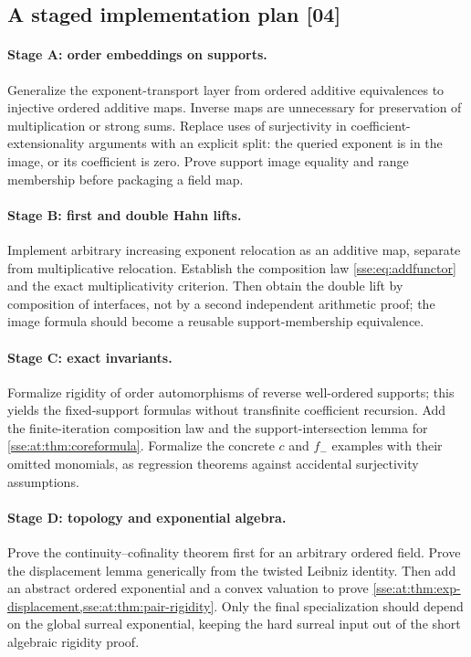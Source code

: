 \documentclass[11pt,a4paper]{article}
\numberwithin{equation}{section}
\theoremstyle{plain}
\theoremstyle{definition}
\theoremstyle{remark}
\newcommand{\src}[1]{\textup{\textsf{\small[#1]}}}%
\begin{document}
\subsection{A staged implementation plan \src{04}}
\paragraph{Stage A: order embeddings on supports.} Generalize the
exponent-transport layer from ordered additive equivalences to injective
ordered additive maps. Inverse maps are unnecessary for preservation of
multiplication or strong sums. Replace uses of surjectivity in
coefficient-extensionality arguments with an explicit split: the queried
exponent is in the image, or its coefficient is zero. Prove support image
equality and range membership before packaging a field map.

\paragraph{Stage B: first and double Hahn lifts.} Implement arbitrary
increasing exponent relocation as an additive map, separate from
multiplicative relocation. Establish the composition law
\eqref{sse:eq:addfunctor} and the exact multiplicativity criterion. Then obtain
the double lift by composition of interfaces, not by a second independent
arithmetic proof; the image formula should become a reusable
support-membership equivalence.

\paragraph{Stage C: exact invariants.} Formalize rigidity of order
automorphisms of reverse well-ordered supports; this yields the fixed-support
formulas without transfinite coefficient recursion. Add the finite-iteration
composition law and the support-intersection lemma for
\cref{sse:at:thm:coreformula}. Formalize the concrete $c$ and $f_-$ examples with
their omitted monomials, as regression theorems against accidental
surjectivity assumptions.

\paragraph{Stage D: topology and exponential algebra.} Prove the
continuity--cofinality theorem first for an arbitrary ordered field. Prove the
displacement lemma generically from the twisted Leibniz identity. Then add an
abstract ordered exponential and a convex valuation to prove
\cref{sse:at:thm:exp-displacement,sse:at:thm:pair-rigidity}. Only the final
specialization should depend on the global surreal exponential, keeping the
hard surreal input out of the short algebraic rigidity proof.
\end{document}
